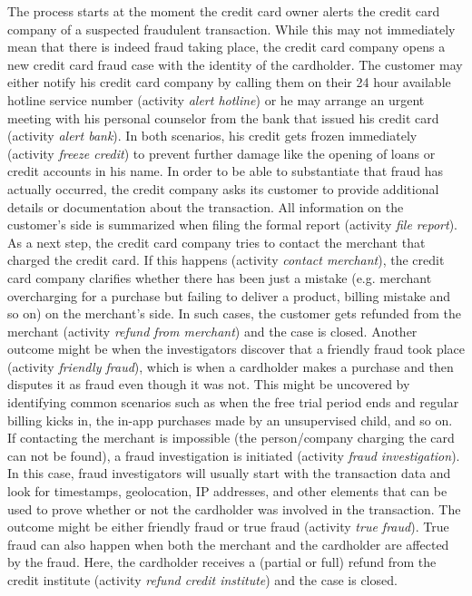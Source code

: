 The process starts at the moment the credit card owner alerts the credit card company of a suspected fraudulent transaction.
While this may not immediately mean that there is indeed fraud taking place, the credit card company opens a new credit card fraud case with the identity of the cardholder.
The customer may either notify his credit card company by calling them on their 24 hour available hotline service number (activity \textit{alert hotline}) or he may arrange an urgent meeting with his personal counselor from the bank that issued his credit card (activity \textit{alert bank}).
In both scenarios, his credit gets frozen immediately (activity \textit{freeze credit}) to prevent further damage like the opening of loans or credit accounts in his name.
In order to be able to substantiate that fraud has actually occurred, the credit company asks its customer to provide additional details or documentation about the transaction. 
All information on the customer's side is summarized when filing the formal report (activity \textit{file report}).
As a next step, the credit card company tries to contact the merchant that charged the credit card.
If this happens (activity \textit{contact merchant}), the credit card company clarifies whether there has been just a mistake (e.g. merchant overcharging for a purchase but failing to deliver a product, billing mistake and so on) on the merchant's side. 
In such cases, the customer gets refunded from the merchant (activity \textit{refund from merchant}) and the case is closed.
Another outcome might be when the investigators discover that a friendly fraud took place (activity \textit{friendly fraud}), which is when a cardholder makes a purchase and then disputes it as fraud even though it was not.
This might be uncovered by identifying common scenarios such as when the free trial period ends and regular billing kicks in, the in-app purchases made by an unsupervised child, and so on. 
If contacting the merchant is impossible (the person/company charging the card can not be found), a fraud investigation is initiated (activity \textit{fraud investigation}).
In this case, fraud investigators will usually start with the transaction data and look for timestamps, geolocation, IP addresses, and other elements that can be used to prove whether or not the cardholder was involved in the transaction.
The outcome might be either friendly fraud or true fraud (activity \textit{true fraud}).
True fraud can also happen when both the merchant and the cardholder are affected by the fraud.
Here, the cardholder receives a (partial or full) refund from the credit institute (activity \textit{refund credit institute}) and the case is closed.



